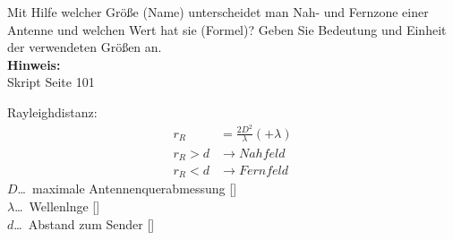 \begin{question}[section=11,name={Rayleightdistanz},difficulty=,quantity=3,type=thr,tags={20151210,20130314,20061016}]
	Mit Hilfe welcher Größe (Name) unterscheidet man Nah- und Fernzone einer Antenne und welchen Wert hat sie (Formel)? Geben Sie Bedeutung und Einheit der verwendeten Größen an. 
	\\ \textbf{Hinweis:}\\
	Skript Seite 101
\end{question}
\begin{solution}
	Rayleighdistanz:
	\begin{align}
		r_R &= \frac{2D^2}{\lambda} (+\lambda)\\
	r_R > d &\rightarrow Nahfeld\\
	r_R < d &\rightarrow Fernfeld
\end{align}
	$D$\dots\ maximale Antennenquerabmessung [\metre]\\
	$\lambda$\dots\ Wellenlnge [\metre]\\
	$d$\dots\ Abstand zum Sender [\metre]
\end{solution}
